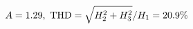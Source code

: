 \documentclass[preview]{standalone}
\begin{document}
\begin{align*}
\special{dvisvgm:raw <g id='unique000'>}A=1.29,\ \text{THD}=\sqrt{H_2^2+H_3^2}/H_1=20.9\%\special{dvisvgm:raw </g>}
\end{align*}
\end{document}
